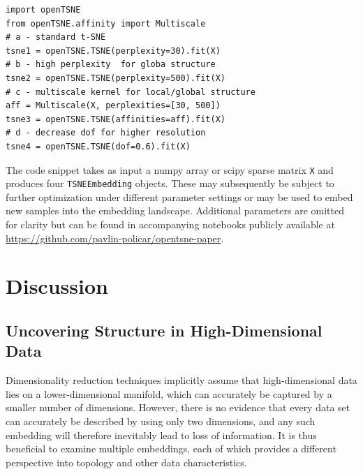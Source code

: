 \documentclass[twocolumn]{bmcart}
\begin{document}
\begin{verbatim}
import openTSNE
from openTSNE.affinity import Multiscale
# a - standard t-SNE
tsne1 = openTSNE.TSNE(perplexity=30).fit(X)
# b - high perplexity  for globa structure
tsne2 = openTSNE.TSNE(perplexity=500).fit(X)
# c - multiscale kernel for local/global structure
aff = Multiscale(X, perplexities=[30, 500])
tsne3 = openTSNE.TSNE(affinities=aff).fit(X)
# d - decrease dof for higher resolution
tsne4 = openTSNE.TSNE(dof=0.6).fit(X)
\end{verbatim}

\noindent The code snippet takes as input a \textsf{numpy} array or
\textsf{scipy} sparse matrix \texttt{X} and produces four
\texttt{TSNEEmbedding} objects. These may subsequently be subject to further
optimization under different parameter settings or may be used to embed new
samples into the embedding landscape. Additional parameters are omitted for
clarity but can be found in accompanying notebooks publicly available at
\url{https://github.com/pavlin-policar/opentsne-paper}.

\section*{Discussion}

\subsection*{Uncovering Structure in High-Dimensional Data}

Dimensionality reduction techniques implicitly assume that high-dimensional
data lies on a lower-dimensional manifold, which can accurately be captured by
a smaller number of dimensions. However, there is no evidence that
every data set can accurately be described by using only two dimensions, and any such embedding will therefore inevitably lead to loss of
information. It is thus beneficial to examine multiple embeddings, each
of which provides a different perspective into topology and other
data characteristics.
\end{document}
